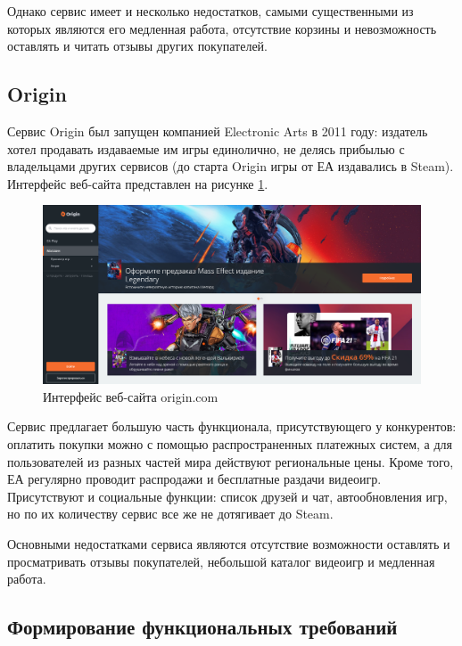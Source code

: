 Однако сервис имеет и несколько недостатков, самыми существенными из которых являются его медленная работа, отсутствие корзины и невозможность оставлять и читать отзывы других покупателей.

\subsection{Origin}
\label{sec:analogues:origin}

Сервис Origin был запущен компанией Electronic Arts в 2011 году: издатель хотел продавать издаваемые им игры единолично, не делясь прибылью с владельцами других сервисов (до старта Origin игры от ЕА издавались в Steam).
Интерфейс веб-сайта представлен на рисунке \ref*{sec:analogues:origin:layout}.

\begin{figure}[!htb]
	\centering
	  \includegraphics[scale=0.3]{attachments/origin.png}  
	  \caption{ Интерфейс веб-сайта origin.com }
	  \label{sec:analogues:origin:layout}
\end{figure}

Сервис предлагает большую часть функционала, присутствующего у конкурентов: оплатить покупки можно с помощью распространенных платежных систем, а для пользователей из разных частей мира действуют региональные цены. Кроме того, ЕА регулярно проводит распродажи и бесплатные раздачи видеоигр. Присутствуют и социальные функции: список друзей и чат, автообновления игр, но по их количеству сервис все же не дотягивает до Steam.

Основными недостатками сервиса являются отсутствие возможности оставлять и просматривать отзывы покупателей, небольшой каталог видеоигр и медленная работа.

\subsection{Формирование функциональных требований}
\label{sec:analogues:requirements}

